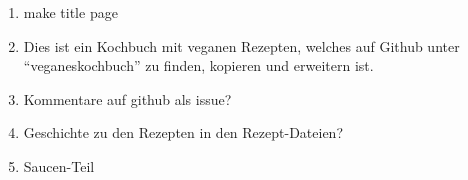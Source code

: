 \documentclass[12pt,a4paper]{article}
\begin{document}
\begin{enumerate}
	\item make title page
	\item Dies ist ein Kochbuch mit veganen Rezepten, welches auf Github unter \enquote{veganeskochbuch} zu finden, kopieren und erweitern ist.\\
	\item Kommentare auf github als issue?
	\item Geschichte zu den Rezepten in den Rezept-Dateien?
	\item Saucen-Teil
\end{enumerate}
\clearpage

	
	
%	
\end{document}
